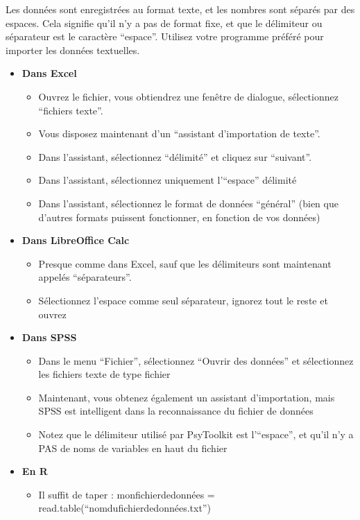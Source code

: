 \documentclass[
]{book}
\providecommand{\tightlist}{%
  \setlength{\itemsep}{0pt}\setlength{\parskip}{0pt}}
\begin{document}
Les données sont enregistrées au format texte, et les nombres sont séparés par des espaces. Cela signifie qu'il n'y a pas de format fixe, et que le délimiteur ou séparateur est le caractère ``espace''. Utilisez votre programme préféré pour importer les données textuelles.

\begin{itemize}
\tightlist
\item
  \textbf{Dans Excel}

  \begin{itemize}
  \tightlist
  \item
    Ouvrez le fichier, vous obtiendrez une fenêtre de dialogue, sélectionnez ``fichiers texte''.
  \item
    Vous disposez maintenant d'un ``assistant d'importation de texte''.
  \item
    Dans l'assistant, sélectionnez ``délimité'' et cliquez sur ``suivant''.
  \item
    Dans l'assistant, sélectionnez uniquement l'``espace'' délimité
  \item
    Dans l'assistant, sélectionnez le format de données ``général'' (bien que d'autres formats puissent fonctionner, en fonction de vos données)
  \end{itemize}
\item
  \textbf{Dans LibreOffice Calc}

  \begin{itemize}
  \tightlist
  \item
    Presque comme dans Excel, sauf que les délimiteurs sont maintenant appelés ``séparateurs''.
  \item
    Sélectionnez l'espace comme seul séparateur, ignorez tout le reste et ouvrez
  \end{itemize}
\item
  \textbf{Dans SPSS}

  \begin{itemize}
  \tightlist
  \item
    Dans le menu ``Fichier'', sélectionnez ``Ouvrir des données'' et sélectionnez les fichiers texte de type fichier
  \item
    Maintenant, vous obtenez également un assistant d'importation, mais SPSS est intelligent dans la reconnaissance du fichier de données
  \item
    Notez que le délimiteur utilisé par PsyToolkit est l'``espace'', et qu'il n'y a PAS de noms de variables en haut du fichier
  \end{itemize}
\item
  \textbf{En R}

  \begin{itemize}
  \tightlist
  \item
    Il suffit de taper : monfichierdedonnées = read.table(``nomdufichierdedonnées.txt'')
  \end{itemize}
\end{itemize}
\end{document}
